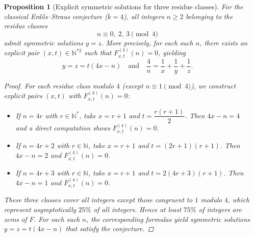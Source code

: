 \documentclass[12pt]{article}
\newtheorem{proposition}{Proposition}
\begin{document}
\begin{proposition}[Explicit symmetric solutions for three residue classes]
For the classical Erdős--Straus conjecture (\(k=4\)), all integers \(n \ge 2\) belonging to the residue classes
\[
n \equiv 0,\ 2,\ 3 \pmod{4}
\]
admit symmetric solutions \(y = z\). More precisely, for each such \(n\), there exists an explicit pair \((x,t) \in \mathbb{N}^{*2}\) such that \(F_{x,t}^{(4)}(n) = 0\), yielding
\[
y = z = t(4x-n) \quad \text{and} \quad \frac{4}{n} = \frac{1}{x} + \frac{1}{y} + \frac{1}{z}.
\]


\begin{proof}
For each residue class modulo \(4\) (except \(n \equiv 1 \pmod{4}\)), we construct explicit pairs \((x,t)\) with \(F_{x,t}^{(4)}(n)=0\):

\begin{itemize}
    \item If \(n = 4r\) with \(r \in \mathbb{N}^*\), take \(x = r+1\) and \(t = \dfrac{r(r+1)}{2}\). Then \(4x-n = 4\) and a direct computation shows \(F_{x,t}^{(4)}(n)=0\).
    
    \item If \(n = 4r+2\) with \(r \in \mathbb{N}\), take \(x = r+1\) and \(t = (2r+1)(r+1)\). Then \(4x-n = 2\) and \(F_{x,t}^{(4)}(n)=0\).
    
    \item If \(n = 4r+3\) with \(r \in \mathbb{N}\), take \(x = r+1\) and \(t = 2(4r+3)(r+1)\). Then \(4x-n = 1\) and \(F_{x,t}^{(4)}(n)=0\).
\end{itemize}

These three classes cover all integers except those congruent to \(1\) modulo \(4\), which represent asymptotically \(25\%\) of all integers. Hence at least \(75\%\) of integers are zeros of \(F\). For each such \(n\), the corresponding formulas yield symmetric solutions \(y = z = t(4x-n)\) that satisfy the conjecture.
\end{proof}
\end{proposition}
\end{document}
